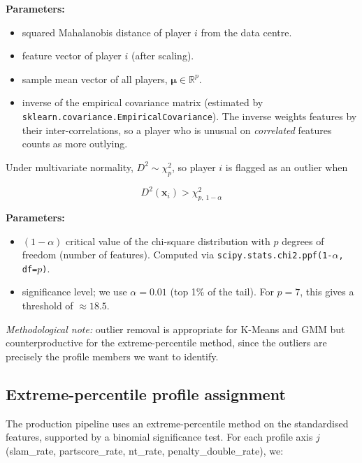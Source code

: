 \documentclass[11pt, a4paper, oneside, openany]{report}
\begin{document}
\noindent\textbf{Parameters:}
\begin{itemize}[leftmargin=2.2cm, itemsep=0pt, topsep=2pt]
    \item[$D^2(\mathbf{x}_i)$] squared Mahalanobis distance of player $i$ from the data centre.
    \item[$\mathbf{x}_i$] feature vector of player $i$ (after scaling).
    \item[$\boldsymbol{\mu}$] sample mean vector of all players, $\boldsymbol{\mu} \in \mathbb{R}^p$.
    \item[$\mathbf{S}^{-1}$] inverse of the empirical covariance matrix (estimated by \texttt{sklearn.covariance.EmpiricalCovariance}). The inverse weights features by their inter-correlations, so a player who is unusual on \emph{correlated} features counts as more outlying.
\end{itemize}

Under multivariate normality, $D^2 \sim \chi^2_p$, so player $i$ is flagged as an outlier when

\begin{equation}
\label{eq:mahalanobis_threshold}
D^2(\mathbf{x}_i) > \chi^2_{p,\, 1 - \alpha}
\end{equation}

\noindent\textbf{Parameters:}
\begin{itemize}[leftmargin=2.2cm, itemsep=0pt, topsep=2pt]
    \item[$\chi^2_{p, 1-\alpha}$] $(1-\alpha)$ critical value of the chi-square distribution with $p$ degrees of freedom (number of features). Computed via \texttt{scipy.stats.chi2.ppf(1-$\alpha$, df=$p$)}.
    \item[$\alpha$] significance level; we use $\alpha = 0.01$ (top 1\% of the tail). For $p = 7$, this gives a threshold of $\approx 18.5$.
\end{itemize}

\noindent\emph{Methodological note:} outlier removal is appropriate for K-Means and GMM but counterproductive for the extreme-percentile method, since the outliers are precisely the profile members we want to identify.

\subsection{Extreme-percentile profile assignment}

The production pipeline uses an extreme-percentile method on the standardised features, supported by a binomial significance test. For each profile axis $j$ (slam\_rate, partscore\_rate, nt\_rate, penalty\_double\_rate), we:
\end{document}
